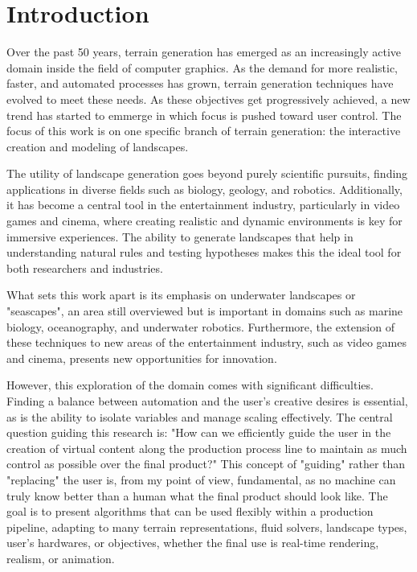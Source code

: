 \chapter{Introduction}
\label{chap:introduction}

Over the past 50 years, terrain generation has emerged as an increasingly active domain inside the field of computer graphics. As the demand for more realistic, faster, and automated processes has grown, terrain generation techniques have evolved to meet these needs. As these objectives get progressively achieved, a new trend has started to emmerge in which focus is pushed toward user control. The focus of this work is on one specific branch of terrain generation: the interactive creation and modeling of landscapes.

The utility of landscape generation goes beyond purely scientific pursuits, finding applications in diverse fields such as biology, geology, and robotics. Additionally, it has become a central tool in the entertainment industry, particularly in video games and cinema, where creating realistic and dynamic environments is key for immersive experiences. The ability to generate landscapes that help in understanding natural rules and testing hypotheses makes this the ideal tool for both researchers and industries.

What sets this work apart is its emphasis on underwater landscapes or "seascapes", an area still overviewed but is important in domains such as marine biology, oceanography, and underwater robotics. Furthermore, the extension of these techniques to new areas of the entertainment industry, such as video games and cinema, presents new opportunities for innovation.

However, this exploration of the domain comes with significant difficulties. Finding a balance between automation and the user's creative desires is essential, as is the ability to isolate variables and manage scaling effectively. 
The central question guiding this research is: "How can we efficiently guide the user in the creation of virtual content along the production process line to maintain as much control as possible over the final product?" This concept of "guiding" rather than "replacing" the user is, from my point of view, fundamental, as no machine can truly know better than a human what the final product should look like. The goal is to present algorithms that can be used flexibly within a production pipeline, adapting to many terrain representations, fluid solvers, landscape types, user's hardwares, or objectives, whether the final use is real-time rendering, realism, or animation.

